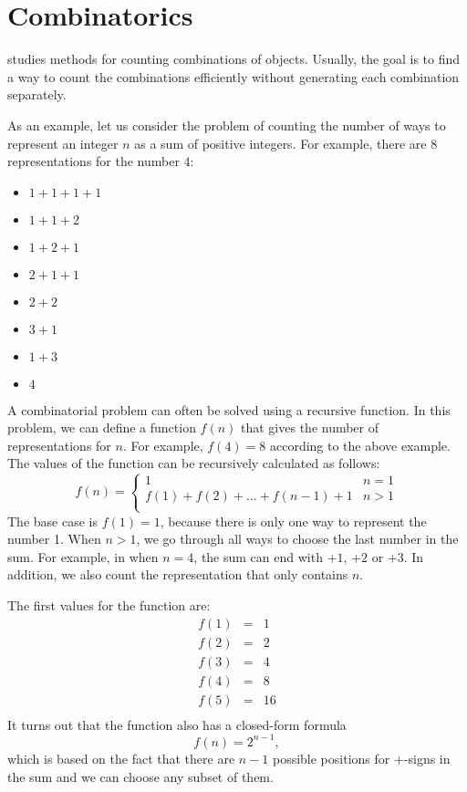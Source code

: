 \chapter{Combinatorics}


 studies methods for counting
combinations of objects.
Usually, the goal is to find a way to
count the combinations efficiently
without generating each combination separately.

As an example, let us consider the problem
of counting the number of ways to
represent an integer $n$ as a sum of positive integers.
For example, there are 8 representations
for the number $4$:
\begin{multicols}{2}
\begin{itemize}
\item $1+1+1+1$
\item $1+1+2$
\item $1+2+1$
\item $2+1+1$
\item $2+2$
\item $3+1$
\item $1+3$
\item $4$
\end{itemize}
\end{multicols}

A combinatorial problem can often be solved
using a recursive function.
In this problem, we can define a function $f(n)$
that gives the number of representations for $n$.
For example, $f(4)=8$ according to the above example.
The values of the function
can be recursively calculated as follows:
\begin{equation*}
    f(n) = \begin{cases}
               1               & n = 1\\
               f(1)+f(2)+\ldots+f(n-1)+1 & n > 1\\
           \end{cases}
\end{equation*}
The base case is $f(1)=1$,
because there is only one way to represent the number 1.
When $n>1$, we go through all ways to
choose the last number in the sum.
For example, in when $n=4$, the sum can end
with $+1$, $+2$ or $+3$.
In addition, we also count the representation
that only contains $n$.

The first values for the function are:
\[
\begin{array}{lcl}
f(1) & = & 1 \\
f(2) & = & 2 \\
f(3) & = & 4 \\
f(4) & = & 8 \\
f(5) & = & 16 \\
\end{array}
\]
It turns out that the function also has a closed-form formula
\[
f(n)=2^{n-1},
\]
which is based on the fact that there are $n-1$
possible positions for +-signs in the sum
and we can choose any subset of them.

